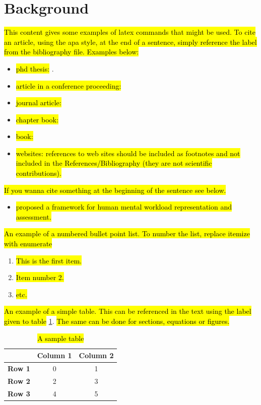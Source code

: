 \documentclass[oneside,12pt]{book}
\begin{document}
\section{Background}
\par \hl{This content gives some examples of latex commands that might be used. To cite an article, using the apa style, at the end of a sentence, simply reference the label from the bibliography file. Examples below:}
\begin{itemize} 
\item \hl{phd thesis:} \cite{Longo2014}.
\item \hl{article in a conference proceeding:} \cite{Longo2016}
\item \hl{journal article:} \cite{einstein}
\item \hl{chapter book:} \cite{Longo2011c}
\item \hl{book:} \cite{dirac}
\item \hl{websites: references to web sites should be included as footnotes and not included in the References/Bibliography (they are not scientific contributions).}
\end{itemize}

\hl{If you wanna cite something at the beginning of the sentence see below.}

\begin{itemize}
    \item {} \hl{proposed a framework for human mental workload representation and assessment.}
\end{itemize}

\par \hl{An example of a numbered bullet point list. To number the list, replace itemize with enumerate}
\begin{enumerate}
\item \hl{This is the first item.}
\item \hl{Item number 2.}
\item \hl{etc.}
\end{enumerate}

\par \hl{An example of a simple table. This can be referenced in the text using the label given to table} \ref{tab:sample_table}. \hl{The same can be done for sections, equations or figures.}
\begin{table}[H]
  \centering
    \caption{\hl{A sample table}}
    \begin{tabular}{| c | c | c |}
    \hline
     & \textbf{Column 1} & \textbf{Column 2} \\ \hline
    \textbf{Row 1} & 0 & 1 \\ \hline
    \textbf{Row 2} & 2 & 3 \\ \hline
    \textbf{Row 3} & 4 & 5 \\ \hline
    \end{tabular}
  \label{tab:sample_table}
\end{table}
\end{document}
